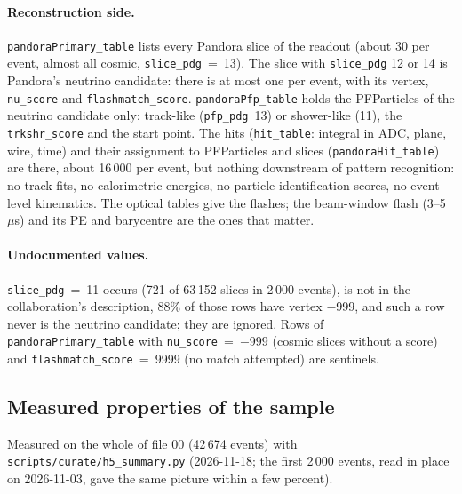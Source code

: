 \documentclass[10pt,letterpaper]{article}
\newcommand{\code}[1]{\texttt{#1}}
\newcommand{\pct}[1]{#1\%}
\begin{document}
\paragraph{Reconstruction side.} \code{pandoraPrimary\_table} lists every Pandora slice of the readout (about 30 per
event, almost all cosmic, \code{slice\_pdg}~=~13). The slice with \code{slice\_pdg} 12 or 14 is Pandora's neutrino
candidate: there is at most one per event, with its vertex, \code{nu\_score} and \code{flashmatch\_score}.
\code{pandoraPfp\_table} holds the PFParticles of the neutrino candidate only: track-like (\code{pfp\_pdg}~13) or
shower-like (11), the \code{trkshr\_score} and the start point. The hits (\code{hit\_table}: integral in ADC, plane,
wire, time) and their assignment to PFParticles and slices (\code{pandoraHit\_table}) are there, about 16\,000 per
event, but nothing downstream of pattern recognition: no track fits, no calorimetric energies, no particle-identification
scores, no event-level kinematics. The optical tables give the flashes; the beam-window flash (3--5\,$\mu$s) and its PE
and barycentre are the ones that matter.

\paragraph{Undocumented values.} \code{slice\_pdg}~=~11 occurs (721 of 63\,152 slices in 2\,000 events), is not in the
collaboration's description, \pct{88} of those rows have vertex $-999$, and such a row never is the neutrino candidate;
they are ignored. Rows of \code{pandoraPrimary\_table} with \code{nu\_score}~=~$-999$ (cosmic slices without a score)
and \code{flashmatch\_score}~=~9999 (no match attempted) are sentinels.

\subsection{Measured properties of the sample}\label{sec:measured}

Measured on the whole of file 00 (42\,674 events) with \code{scripts/curate/h5\_summary.py} (2026-11-18; the
first 2\,000 events, read in place on 2026-11-03, gave the same picture within a few percent).
\end{document}
